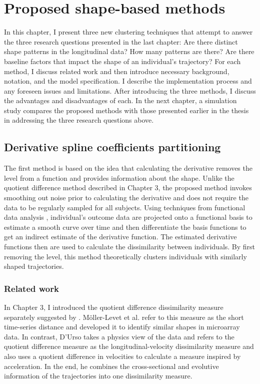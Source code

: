 \chapter{Proposed shape-based methods}
In this chapter, I present three new clustering techniques that attempt to answer the three research questions presented in the last chapter: Are there distinct shape patterns in the longitudinal data? How many patterns are there? Are there baseline factors that impact the shape of an individual's trajectory? For each method, I discuss related work and then introduce necessary background, notation, and the model specification. I describe the implementation process and any foreseen issues and limitations. After introducing the three methods, I discuss the advantages and disadvantages of each. In the next chapter, a simulation study compares the proposed methods with those presented earlier in the thesis in addressing the three research questions above.

\section{Derivative spline coefficients partitioning}
The first method is based on the idea that calculating the derivative removes the level from a function and provides information about the shape. Unlike the quotient difference method described in Chapter 3,  the proposed method invokes smoothing out noise prior to calculating the derivative and does not require the data to be regularly sampled for all subjects. Using techniques from functional data analysis \cite{ramsay2002}, individual's outcome data are projected onto a functional basis to estimate a smooth curve over time and then differentiate the basis functions to get an indirect estimate of the derivative function. The estimated derivative functions then are used to calculate the dissimilarity between individuals. By first removing the level, this  method theoretically clusters individuals with similarly shaped trajectories.

\subsection{Related work}
In Chapter 3, I introduced the quotient difference dissimilarity measure separately suggested by \textcite{d2000,moller2003}. M{\"o}ller-Levet et al. refer to this measure as the short time-series distance and developed it to identify similar shapes in microarray data. In contrast, D'Urso takes a physics view of the data and refers to the quotient difference measure as the longitudinal-velocity dissimilarity measure and also uses a quotient difference in velocities to calculate a measure inspired by acceleration. In the end, he combines the cross-sectional and evolutive information of the trajectories into one dissimilarity measure.

